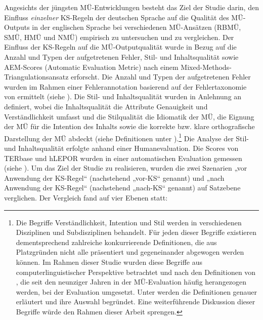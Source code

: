 Angesichts der jüngsten MÜ-Entwicklungen besteht das  Ziel der Studie darin, den Einfluss \textit{einzelner} KS-Regeln der deutschen Sprache auf die Qualität des MÜ-Outputs in der englischen Sprache bei verschiedenen MÜ-Ansätzen (RBMÜ, SMÜ, HMÜ und NMÜ) empirisch zu untersuchen und zu vergleichen. Der Einfluss der KS-Regeln auf die MÜ-Outputqualität wurde in Bezug auf die Anzahl und Typen der aufgetretenen Fehler, Stil- und Inhaltsqualität sowie AEM-Scores (Automatic Evaluation Metric) nach einem Mixed-Methods-Triangulationsansatz erforscht. Die Anzahl und Typen der aufgetretenen Fehler wurden im Rahmen einer Fehlerannotation basierend auf der Fehlertaxonomie von \citet{VilarEtAl2006} ermittelt (siehe ). Die Stil- und Inhaltsqualität wurden in Anlehnung an \citet[163]{HutchinsSomers1992} definiert, wobei die Inhaltsqualität die Attribute Genauigkeit und Verständlichkeit umfasst und die Stilqualität die Idiomatik der MÜ, die Eignung der MÜ für die Intention des Inhalts sowie die korrekte bzw. klare orthografische Darstellung der MÜ abdeckt (siehe Definitionen unter ).\footnote{\textrm{Die Begriffe Verständlichkeit, Intention und Stil werden in verschiedenen Disziplinen und Subdisziplinen behandelt. Für jeden dieser Begriffe existieren dementsprechend zahlreiche konkurrierende Definitionen, die aus Platzgründen nicht alle präsentiert und gegeneinander abgewogen werden können. Im Rahmen dieser Studie wurden diese Begriffe aus computerlinguistischer Perspektive betrachtet und nach den Definitionen von \citet{HutchinsSomers1992}, die seit den neunziger Jahren in der MÜ-Evaluation häufig herangezogen werden, bei der Evaluation umgesetzt. Unter  werden die Definitionen genauer erläutert und ihre Auswahl begründet. Eine weiterführende Diskussion dieser Begriffe würde den Rahmen dieser Arbeit sprengen.}} Die Analyse der Stil- und Inhaltsqualität erfolgte anhand einer Humanevaluation. Die Scores von TERbase \citep{SnoverEtAl2006} und hLEPOR \citep{HanEtAl2013} wurden in einer automatischen Evaluation gemessen (siehe ). Um das Ziel der Studie zu realisieren, wurden die zwei Szenarien „vor Anwendung der KS-Regel“ (nachstehend „vor-KS“ genannt) und „nach Anwendung der KS-Regel“ (nachstehend „nach-KS“ genannt) auf Satzebene verglichen. Der Vergleich fand auf vier Ebenen statt:

